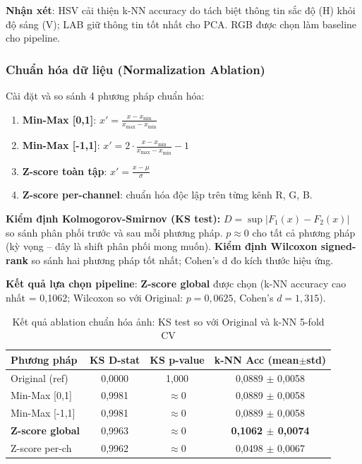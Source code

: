 \documentclass[12pt,a4paper]{article}
\let\oldtextbf\textbf
\renewcommand{\textbf}[1]{\oldtextbf{\textcolor{hcmublue}{#1}}}
\begin{document}
\textbf{Nhận xét}: HSV cải thiện k-NN accuracy do tách biệt thông tin sắc độ (H) khỏi độ sáng (V); LAB giữ thông tin tốt nhất cho PCA. RGB được chọn làm baseline cho pipeline.

\subsubsection{Chuẩn hóa dữ liệu (Normalization Ablation)}

Cài đặt và so sánh 4 phương pháp chuẩn hóa:
\begin{enumerate}
    \item \textbf{Min-Max [0,1]}: $x' = \frac{x - x_{\min}}{x_{\max} - x_{\min}}$
    \item \textbf{Min-Max [-1,1]}: $x' = 2\cdot\frac{x - x_{\min}}{x_{\max} - x_{\min}} - 1$
    \item \textbf{Z-score toàn tập}: $x' = \frac{x - \mu}{\sigma}$
    \item \textbf{Z-score per-channel}: chuẩn hóa độc lập trên từng kênh R, G, B.
\end{enumerate}

\textbf{Kiểm định Kolmogorov-Smirnov (KS test):} $D = \sup|F_1(x) - F_2(x)|$ so sánh phân phối trước và sau mỗi phương pháp. $p \approx 0$ cho tất cả phương pháp (kỳ vọng -- đây là shift phân phối mong muốn). \textbf{Kiểm định Wilcoxon signed-rank} so sánh hai phương pháp tốt nhất; Cohen's d đo kích thước hiệu ứng.

\textbf{Kết quả lựa chọn pipeline}: \textbf{Z-score global} được chọn (k-NN accuracy cao nhất = 0{,}1062; Wilcoxon so với Original: $p = 0{,}0625$, Cohen's $d = 1{,}315$).

\begin{table}[H]
\centering
\small
\begin{tabular}{|l|c|c|c|}
\hline
\textbf{Phương pháp} & \textbf{KS D-stat} & \textbf{KS p-value} & \textbf{k-NN Acc (mean$\pm$std)} \\ \hline
Original (ref)              & 0{,}0000 & 1{,}000       & 0{,}0889 $\pm$ 0{,}0058 \\ \hline
Min-Max {[}0,1{]}           & 0{,}9981 & $\approx 0$   & 0{,}0889 $\pm$ 0{,}0058 \\ \hline
Min-Max {[}-1,1{]}          & 0{,}9981 & $\approx 0$   & 0{,}0889 $\pm$ 0{,}0058 \\ \hline
\textbf{Z-score global}     & 0{,}9963 & $\approx 0$   & \textbf{0{,}1062 $\pm$ 0{,}0074} \\ \hline
Z-score per-ch              & 0{,}9962 & $\approx 0$   & 0{,}0498 $\pm$ 0{,}0067 \\ \hline
\end{tabular}
\caption{Kết quả ablation chuẩn hóa ảnh: KS test so với Original và k-NN 5-fold CV}
\label{tab:norm_ablation}
\end{table}
\end{document}
